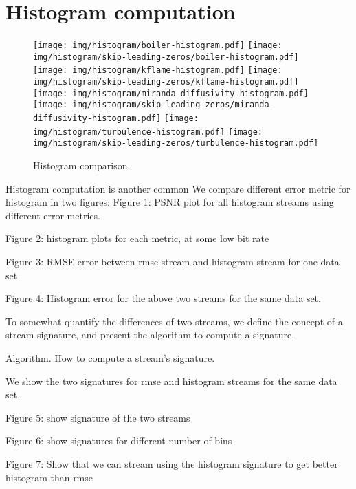 
\section{Histogram computation}

\begin{figure}
	\centering
	{\texttt{[image: img/histogram/boiler-histogram.pdf]}}
	{\texttt{[image: img/histogram/skip-leading-zeros/boiler-histogram.pdf]}}
	{\texttt{[image: img/histogram/kflame-histogram.pdf]}}
	{\texttt{[image: img/histogram/skip-leading-zeros/kflame-histogram.pdf]}}
	{\texttt{[image: img/histogram/miranda-diffusivity-histogram.pdf]}}
	{\texttt{[image: img/histogram/skip-leading-zeros/miranda-diffusivity-histogram.pdf]}}
	{\texttt{[image: img/histogram/turbulence-histogram.pdf]}}
	{\texttt{[image: img/histogram/skip-leading-zeros/turbulence-histogram.pdf]}}
	\caption{Histogram comparison.}
	\label{fig:histogram-comparison}
\end{figure}

Histogram computation is another common 
We compare different error metric for histogram in two figures:
Figure 1: PSNR plot for all histogram streams using different error metrics.

Figure 2: histogram plots for each metric, at some low bit rate

Figure 3: RMSE error between rmse stream and histogram stream for one data set

Figure 4: Histogram error for the  above two streams for the same data set.

To somewhat quantify the differences of two streams, we define the concept of a stream signature, and present the algorithm to compute a signature.

Algorithm. How to compute a stream's signature.

We show the two signatures for rmse and histogram streams for the same data set.

Figure 5: show signature of the two streams

Figure 6: show signatures for different number of bins

Figure 7: Show that we can stream using the histogram signature to get better histogram than rmse